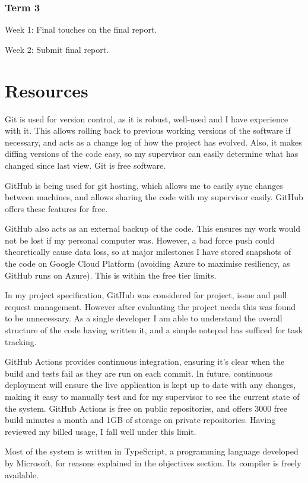 \documentclass[12pt]{article}
\begin{document}
\subsubsection{Term 3}

Week 1: Final touches on the final report.

Week 2: Submit final report.

\section{Resources}

Git is used for version control, as it is robust, well-used and I have experience with it. This allows rolling back to previous working versions of the software if necessary, and acts as a change log of how the project has evolved. Also, it makes diffing versions of the code easy, so my supervisor can easily determine what has changed since last view. Git is free software.

GitHub is being used for git hosting, which allows me to easily sync changes between machines, and allows sharing the code with my supervisor easily. GitHub offers these features for free.

GitHub also acts as an external backup of the code. This ensures my work would not be lost if my personal computer was. However, a bad force push could theoretically cause data loss, so at major milestones I have stored snapshots of the code on Google Cloud Platform (avoiding Azure to maximise resiliency, as GitHub runs on Azure). This is within the free tier limits.

In my project specification, GitHub was considered for project, issue and pull request management. However after evaluating the project needs this was found to be unnecessary. As a single developer I am able to understand the overall structure of the code having written it, and a simple notepad has sufficed for task tracking.

GitHub Actions provides continuous integration, ensuring it’s clear when the build and tests fail as they are run on each commit. In future, continuous deployment will ensure the live application is kept up to date with any changes, making it easy to manually test and for my supervisor to see the current state of the system. GitHub Actions is free on public repositories, and offers 3000 free build minutes a month and 1GB of storage on private repositories. Having reviewed my billed usage, I fall well under this limit.

Most of the system is written in TypeScript, a programming language developed by Microsoft, for reasons explained in the objectives section. Its compiler is freely available.
\end{document}
